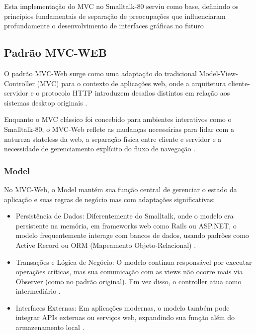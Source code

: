         \par Esta implementação do MVC no Smalltalk-80 serviu como base, definindo os princípios fundamentais de separação de preocupações que influenciaram profundamente o desenvolvimento de interfaces gráficas no futuro \cite{artigo:reenskaug:2003}
            
    \subsection{Padrão MVC-WEB}
    
        \par O padrão MVC-Web surge como uma adaptação do tradicional Model-View-Controller (MVC) para o contexto de aplicações web, onde a arquitetura cliente-servidor e o protocolo HTTP introduzem desafios distintos em relação aos sistemas desktop originais \cite{inproceedings:grove:2011}.
        
        \par Enquanto o MVC clássico foi concebido para ambientes interativos como o Smalltalk-80, o MVC-Web reflete as mudanças necessárias para lidar com a natureza stateless da web, a separação física entre cliente e servidor e a necessidade de gerenciamento explícito do fluxo de navegação \cite{inproceedings:grove:2011}.

        \subsubsection{Model}
        
            \par No MVC-Web, o Model mantém sua função central de gerenciar o estado da aplicação e suas regras de negócio mas com adaptações significativas:

            \begin{itemize}
                \item Persistência de Dados: Diferentemente do Smalltalk, onde o modelo era persistente na memória, em frameworks web como Rails ou ASP.NET, o modelo frequentemente interage com bancos de dados, usando padrões como Active Record ou ORM (Mapeamento Objeto-Relacional) \cite{inproceedings:grove:2011}.
                
                \item Transações e Lógica de Negócio: O modelo continua responsável por executar operações críticas, mas sua comunicação com as views não ocorre mais via Observer (como no padrão original). Em vez disso, o controller atua como intermediário \cite{inproceedings:grove:2011}.
                
                \item Interfaces Externas: Em aplicações modernas, o modelo também pode integrar APIs externas ou serviços web, expandindo sua função além do armazenamento local \cite{inproceedings:grove:2011}.
            \end{itemize}


